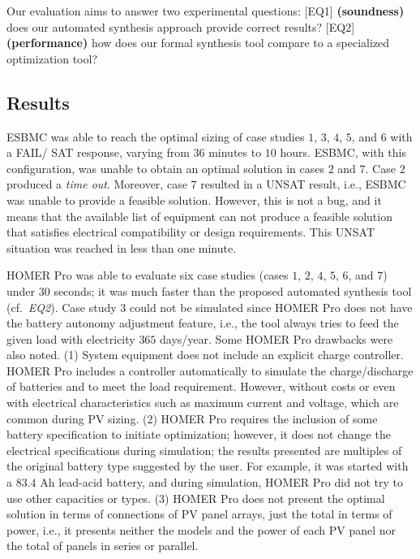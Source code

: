 \documentclass[journal]{IEEEtran}
\begin{document}
Our evaluation aims to answer two experimental questions: [EQ1] \textbf{(soundness)} does our automated synthesis approach provide correct results? [EQ2] \textbf{(performance)} how does our formal synthesis tool compare to a specialized optimization tool?

\subsection{Results}  
ESBMC was able to reach the optimal sizing of case studies $1$, $3$, $4$, $5$, and $6$ with a FAIL/ SAT response, varying from $36$ minutes to $10$ hours. ESBMC, with this configuration, was unable to obtain an optimal solution in cases $2$ and $7$. Case $2$ produced a \textit{time out}. Moreover, case $7$ resulted in a UNSAT result, i.e., ESBMC was unable to provide a feasible solution. However, this is not a bug, and it means that the available list of equipment can not produce a feasible solution that satisfies electrical compatibility or design requirements. This UNSAT situation was reached in less than one minute. %

HOMER Pro was able to evaluate six case studies (cases $1$, $2$, $4$, $5$, $6$, and $7$) under $30$ seconds; it was much faster than the proposed automated synthesis tool (cf.~\textit{EQ2}). Case study $3$ could not be simulated since HOMER Pro does not have the battery autonomy adjustment feature, i.e., the tool always tries to feed the given load with electricity $365$ days/year. Some HOMER Pro drawbacks were also noted. (1) System equipment does not include an explicit charge controller. HOMER Pro includes a controller automatically to simulate the charge/discharge of batteries and to meet the load requirement. However, without costs or even with electrical characteristics such as maximum current and voltage, which are common during PV sizing. (2) HOMER Pro requires the inclusion of some battery specification to initiate optimization; however, it does not change the electrical specifications during simulation; the results presented are multiples of the original battery type suggested by the user. For example, it was started with a $83.4$ Ah lead-acid battery, and during simulation, HOMER Pro did not try to use other capacities or types. (3) HOMER Pro does not present the optimal solution in terms of connections of PV panel arrays, just the total in terms of power, i.e., it presents neither the models and the power of each PV panel nor the total of panels in series or parallel.
\end{document}
